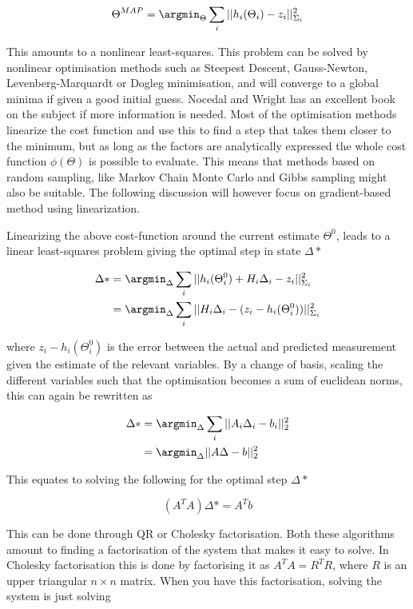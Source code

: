 \begin{equation}
    \Theta^{MAP} = \argmin_{\Theta}\sum_i ||h_i(\Theta_i) - z_i||_{\Sigma_i}^2
\end{equation}

This amounts to a nonlinear least-squares. This problem can be solved by nonlinear optimisation methods such as Steepest Descent, Gauss-Newton, Levenberg-Marquardt or Dogleg minimisation, and will converge to a global minima if given a good initial guess. Nocedal and Wright\cite{NumOpt} has an excellent book on the subject if more information is needed. Most of the optimisation methods linearize the cost function and use this to find a step that takes them closer to the minimum, but as long as the factors are analytically expressed the whole cost function $\phi(\Theta)$ is possible to evaluate. This means that methods based on random sampling, like Markov Chain Monte Carlo and Gibbs sampling\cite{SamplingOpt} might also be suitable. The following discussion will however focus on gradient-based method using linearization.

Linearizing the above cost-function around the current estimate $\Theta^0$, leads to a linear least-squares problem giving the optimal step in state $\Delta*$

\begin{align}
    \Delta* &= \argmin_{\Delta}\sum_i ||h_i(\Theta_i^0) + H_i\Delta_i - z_i||_{\Sigma_i}^2 \\ 
    &= \argmin_{\Delta}\sum_i || H_i\Delta_i - (z_i - h_i(\Theta_i^0))||_{\Sigma_i}^2
\end{align}

where $z_i - h_i(\Theta_i^0)$ is the error between the actual and predicted measurement given the estimate of the relevant variables. By a change of basis, scaling the different variables such that the optimisation becomes a sum of euclidean norms, this can again be rewritten as 

\begin{align}
    \Delta* &= \argmin_{\Delta}\sum_i||A_i\Delta_i - b_i||_2^2 \\
    &= \argmin_{\Delta}||A\Delta - b||_2^2
\end{align}

This equates to solving the following for the optimal step $\Delta*$

\begin{equation}
    (A^TA)\Delta* = A^Tb
\end{equation}

This can be done through QR or Cholesky factorisation. Both these algorithms amount to finding a factorisation of the system that makes it easy to solve. In Cholesky factorisation this is done by factorising it as $A^TA = R^TR$, where $R$ is an upper triangular $n \times n$ matrix. When you have this factorisation, solving the system is just solving 

